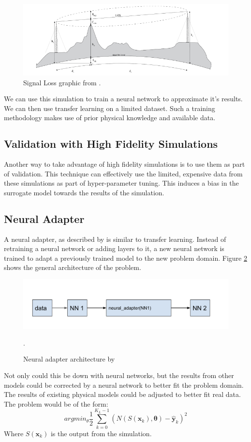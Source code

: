 \documentclass[]{article}
\begin{document}
\begin{figure}
	\centering
	\includegraphics[width=1.0\linewidth]{images/SignalLoss}
	\caption[SigProp]{Signal Loss graphic from \cite{Nicole_SigProp}.}
	\label{fig:signalloss}
\end{figure}

We can use this simulation to train a neural network to approximate it's results.  We can then use transfer learning on a limited dataset.  Such a training methodology makes use of prior physical knowledge and available data.

\subsection{Validation with High Fidelity Simulations}
Another way to take advantage of high fidelity simulations is to use them as part of validation.  This technique can effectively use the limited, expensive data from these simulations as part of hyper-parameter tuning.  This induces a bias in the surrogate model towards the results of the simulation.
\subsection{Neural Adapter}
A neural adapter, as described by \cite{zubov2021neuralpde} is similar to transfer learning.  Instead of retraining a neural network or adding layers to it, a new neural network is trained to adapt a previously trained model to the new problem domain.  Figure \ref{fig:neuraladapter} shows the general architecture of the problem.  
\begin{figure}
	\centering
	\includegraphics[width=1.0\linewidth]{images/neural_adapter}
	\caption[neural adapter]{Neural adapter architecture by \cite{zubov2021neuralpde}}.
	\label{fig:neuraladapter}
\end{figure}
Not only could this be down with neural networks, but the results from other models could be corrected by a neural network to better fit the problem domain.  The results of existing physical models could be adjusted to better fit real data.  The problem would be of the form:
\begin{equation}
arg min_\theta \frac{1}{2}\sum_{k=0}^{K_L - 1}(N(S(\textbf{x}_k), \boldsymbol{\theta}) - \hat{\textbf{y}}_k)^2
\end{equation}
Where $S(\textbf{x}_k)$ is the output from the simulation.
\end{document}
